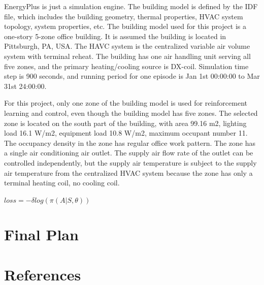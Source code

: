 \documentclass{article}
\begin{document}
EnergyPlus is just a simulation engine. The building model is defined by the IDF file, which includes the building geometry, thermal properties, HVAC system topology, system properties, etc. The building model used for this project is a one-story 5-zone office building. It is assumed the building is located in Pittsburgh, PA, USA. The HAVC system is the centralized variable air volume system with terminal reheat. The building has one air handling unit serving all five zones, and the primary heating/cooling source is DX-coil. Simulation time step is 900 seconds, and running period for one episode is Jan 1st 00:00:00 to Mar 31st 24:00:00. 

For this project, only one zone of the building model is used for reinforcement learning and control, even though the building model has five zones. The selected zone is located on the south part of the building, with area 99.16 m2, lighting load 16.1 W/m2, equipment load 10.8 W/m2, maximum occupant number 11. The occupancy density in the zone has regular office work pattern. The zone has a single air conditioning air outlet. The supply air flow rate of the outlet can be controlled independently, but the supply air temperature is subject to the supply air temperature from the centralized HVAC system because the zone has only a terminal heating coil, no cooling coil.

$loss = -\delta log(\pi(A|S, \theta)) $

\section{Final Plan}

\section*{References}
\end{document}
